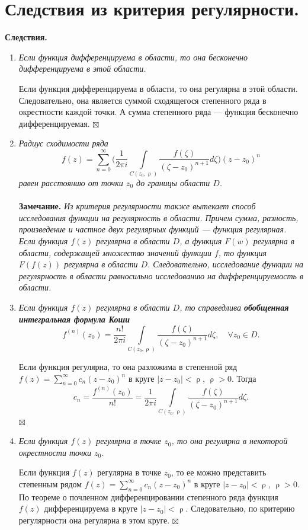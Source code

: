 \documentclass[a4paper, 12pt]{article}
\newenvironment{Proof} %
{\par\noindent{$\blacklozenge$}} %
{\hfill$\scriptstyle\boxtimes$}
\renewcommand{\rho}{\uprho}
\newcommand{\sumz}{\sum\limits_{n = 0}^\infty }
\begin{document}
\section{Следствия из критерия регулярности.}
\textbf{Следствия.}\begin{enumerate}
	\item \textit{Если функция дифференцируема в области, то она бесконечно дифференцируема в этой области.}
	\begin{Proof}
		Если функция дифференцируема в области, то она регулярна в этой области. Следовательно, она является суммой сходящегося степенного ряда в окрестности каждой точки. А сумма степенного ряда --- функция бесконечно дифференцируемая.
	\end{Proof}
\item \textit{Радиус сходимости ряда $$f(z) =\sumz \Big(\dfrac{1}{2\pi i}\int\limits_{C(z_0,\rho)}\dfrac{f(\zeta)}{(\zeta - z_0)^{n+1}}d\zeta\Big)(z-z_0)^n$$ равен расстоянию от точки $z_0$ до границы области $D$.}\\\\
\textbf{Замечание.} \textit{Из критерия регулярности также вытекает способ исследования функции на регулярность в области. Причем сумма, разность, произведение и частное двух регулярных функций --- функция регулярная. Если функция $f(z)$ регулярна в области $D$, а функция $F(w)$ регулярна в области, содержащей множество значений функции $f$, то функция $F(f(z))$ регулярна в области $D$. Следовательно, исследование функции на регулярность в области равносильно исследованию на дифференцируемость в области.}
\item \textit{Если функция $f(z)$ регулярна в области $D$, то справедлива \textbf{обобщенная интегральная формула Коши}} $$f^{(n)}(z_0) = \dfrac{n!}{2\pi i}\int\limits_{C(z_0,\rho)}\dfrac{f(\zeta)}{(\zeta - z_0)^{n+1}}d\zeta,\quad \forall z_0\in D.$$\begin{Proof}
	Если функция регулярна, то она разложима в степенной ряд $f(z) = \sumz c_n(z-z_0)^n$ в круге $|z-z_0|<\rho$, $\rho > 0$. Тогда $$c_n = \dfrac{f^{(n)}(z_0)}{n!} = \dfrac{1}{2\pi i}\int\limits_{C(z_0,\rho)}\dfrac{f(\zeta)}{(\zeta - z_0)^{n+1}}d\zeta.$$
\end{Proof}
\item \textit{Если функция $f(z)$ регулярна в точке $z_0$, то она регулярна в некоторой окрестности точки $z_0$.}\begin{Proof}
	Если функция $f(z)$ регулярна в точке $z_0$, то ее можно представить степенным рядом $f(z) = \sumz c_n(z-z_0)^n$ в круге $|z-z_0|<\rho$, $\rho > 0$. По теореме о почленном дифференцировании степенного ряда функция $f(z)$ дифференцируема в круге $|z-z_0|<\rho$. Следовательно, по критерию регулярности она регулярна в этом круге.
\end{Proof}
\end{enumerate}
\end{document}
